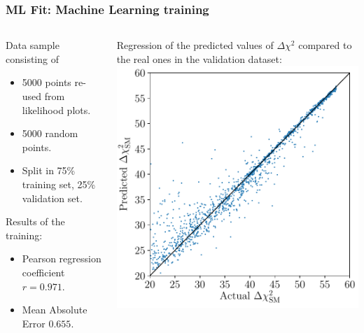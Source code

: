 \documentclass[mathserif, 10pt, dvipsnames]{beamer}
\begin{document}
\begin{frame}\frametitle{ML Fit: Machine Learning training}

    \begin{columns}
        \begin{column}{0.5\textwidth}
            Data sample consisting of
            \begin{itemize}
                \item 5000 points re-used from likelihood plots.
                \item 5000 random points.
                \item Split in 75\% training set, 25\% validation set.
            \end{itemize}
            Results of the training:
            \begin{itemize}
                \item Pearson regression coefficient $r=0.971$.
                \item Mean Absolute Error $0.655$.
            \end{itemize}
        \end{column}
        \begin{column}{0.5\textwidth}
Regression of the predicted values
of $\Delta\chi^2$ compared to the real ones in the validation
dataset:\\[0.2em]
            \includegraphics[width=\columnwidth]{figures/regression_xgb.pdf}
        \end{column}
\end{columns}

\end{frame}
\end{document}
